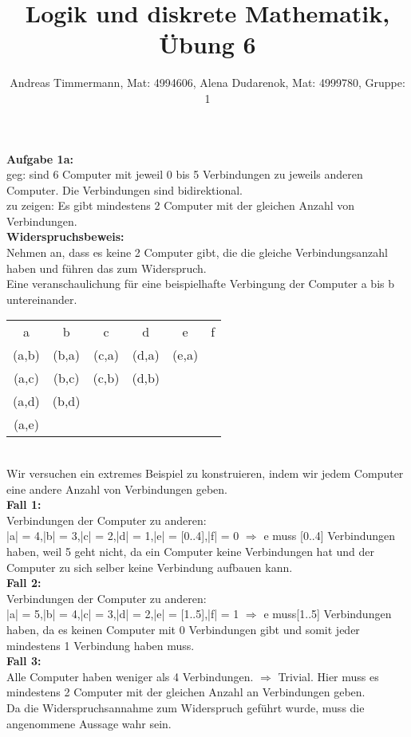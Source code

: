\documentclass[a4paper]{scrartcl}
\title{Logik und diskrete Mathematik, Übung 6}
\author{Andreas Timmermann, Mat: 4994606, Alena Dudarenok, Mat: 4999780, Gruppe: 1}
\begin{document}
	\maketitle
	\begin{flushleft}
		\textbf{Aufgabe 1a:}\\
		geg: sind 6 Computer mit jeweil 0 bis 5 Verbindungen zu jeweils anderen Computer. Die Verbindungen sind bidirektional.\\
		zu zeigen: Es gibt mindestens 2 Computer mit der gleichen Anzahl von Verbindungen.\\[1em]
		\textbf{Widerspruchsbeweis:}\\[1em]
		Nehmen an, dass es keine 2 Computer gibt, die die gleiche Verbindungsanzahl haben und führen das zum Widerspruch.\\[1em]
		Eine veranschaulichung für eine beispielhafte Verbingung der Computer a bis b untereinander.\\
		\begin{tabular}{|c|c|c|c|c|c|}
			a & b & c & d & e & f \\
			(a,b) & (b,a) & (c,a) & (d,a) & (e,a) &   \\
			(a,c) & (b,c) & (c,b) & (d,b) &   &   \\
			(a,d) & (b,d) &       &       &   &   \\
			(a,e) &       &       &       &   &   \\
		 \end{tabular}\\[1em]
		 
		 Wir versuchen ein extremes Beispiel zu konstruieren, indem wir jedem Computer eine andere Anzahl von Verbindungen geben.\\
		 \textbf{Fall 1:}\\
		 Verbindungen der Computer zu anderen:\\
		 |a| = 4,|b| = 3,|c| = 2,|d| = 1,|e| = [0..4],|f| = 0 $\Rightarrow$ e muss [0..4] Verbindungen haben, weil 5 geht nicht, da ein Computer keine Verbindungen hat und der Computer zu sich selber keine Verbindung aufbauen kann.\\
		 \textbf{Fall 2:}\\
		 Verbindungen der Computer zu anderen:\\
		 |a| = 5,|b| = 4,|c| = 3,|d| = 2,|e| = [1..5],|f| = 1 $\Rightarrow$ e muss[1..5] Verbindungen haben, da es keinen Computer mit 0 Verbindungen gibt und somit jeder mindestens 1 Verbindung haben muss.\\
		 \textbf{Fall 3:}\\
		 Alle Computer haben weniger als 4 Verbindungen. $\Rightarrow$ Trivial. Hier muss es mindestens 2 Computer mit der gleichen Anzahl an Verbindungen geben.\\[1em]
		 Da die Widerspruchsannahme zum Widerspruch geführt wurde, muss die angenommene Aussage wahr sein.\\[1em]
	\end{flushleft}
\end{document}

